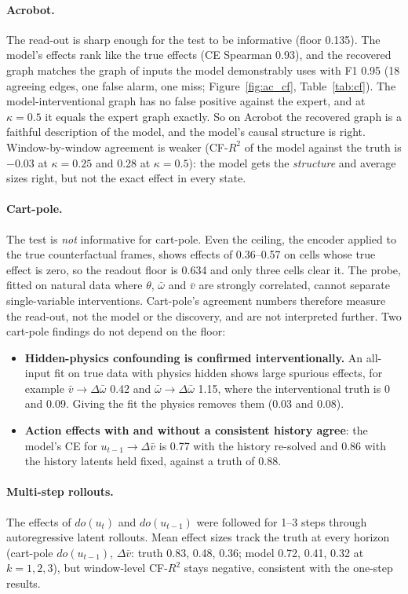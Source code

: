 \documentclass[11pt, a4paper, oneside,enumerate,textcomp]{report}
\newcommand{\vb}{\bar{v}}
\newcommand{\wb}{\bar{\omega}}
\newcommand{\dd}{\Delta}
\newcommand{\Rsq}{R^2}
\begin{document}
\paragraph{Acrobot.} The read-out is sharp enough for the test to be informative (floor 0.135). The model's effects rank like the true effects (CE Spearman 0.93), and the recovered graph matches the graph of inputs the model demonstrably uses with F1 0.95 (18 agreeing edges, one false alarm, one miss; Figure~\ref{fig:ac_cf}, Table~\ref{tab:cf}). The model-interventional graph has no false positive against the expert, and at $\kappa = 0.5$ it equals the expert graph exactly. So on Acrobot the recovered graph is a faithful description of the model, and the model's causal structure is right. Window-by-window agreement is weaker (CF-$\Rsq$ of the model against the truth is $-0.03$ at $\kappa = 0.25$ and 0.28 at $\kappa = 0.5$): the model gets the \emph{structure} and average sizes right, but not the exact effect in every state.

\paragraph{Cart-pole.} The test is \emph{not} informative for cart-pole. Even the ceiling, the encoder applied to the true counterfactual frames, shows effects of 0.36--0.57 on cells whose true effect is zero, so the readout floor is 0.634 and only three cells clear it. The probe, fitted on natural data where $\theta$, $\wb$ and $\vb$ are strongly correlated, cannot separate single-variable interventions. Cart-pole's agreement numbers therefore measure the read-out, not the model or the discovery, and are not interpreted further. Two cart-pole findings do not depend on the floor:
\begin{itemize}
	\item \textbf{Hidden-physics confounding is confirmed interventionally.} An all-input fit on true data with physics hidden shows large spurious effects, for example $\vb \rightarrow \dd\wb$ 0.42 and $\wb \rightarrow \dd\wb$ 1.15, where the interventional truth is 0 and 0.09. Giving the fit the physics removes them (0.03 and 0.08).
	\item \textbf{Action effects with and without a consistent history agree}: the model's CE for $u_{t-1} \rightarrow \dd\vb$ is 0.77 with the history re-solved and 0.86 with the history latents held fixed, against a truth of 0.88.
\end{itemize}

\paragraph{Multi-step rollouts.} The effects of $do(u_t)$ and $do(u_{t-1})$ were followed for 1--3 steps through autoregressive latent rollouts. Mean effect sizes track the truth at every horizon (cart-pole $do(u_{t-1})$, $\dd\vb$: truth 0.83, 0.48, 0.36; model 0.72, 0.41, 0.32 at $k = 1, 2, 3$), but window-level CF-$\Rsq$ stays negative, consistent with the one-step results.
\end{document}
